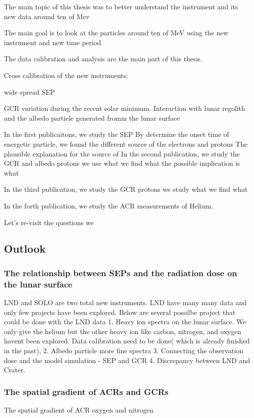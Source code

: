 


The main topic of this thesis was to better understand the instrument and its new data around ten of Mev

The main goal is to look at the particles around ten of MeV using the new instrument and new time period

The data calibration and analysis are the main part of this thesis. 

Cross calibration of the new instruments:


wide spread SEP

\ac{GCR} variation during the recent solar minimum. Interaction with lunar regolith and the albedo particle generated fromm the lunar surface\

In the first publicaitons, we study the SEP
   By determine the onset time of energetic particle, we found the different source of the electrons and protons
  The plausible explanation for the source of 
In the second publication, we study the GCR and albedo protons
  we use what 
  we find what 
   the possible implication is what

In the third publication, we study the GCR protons
   we study what 
   we find what 
   

In the forth publication, we study the ACR measurements of Helium.

Let's re-visit the questions we 
\subsection*{Outlook}

\subsubsection{The relationship between SEPs and the radiation dose on the lunar surface}

LND and SOLO are two total new instruments.
LND have many many data and only few projects have been explored.
Below are several possilbe project that could be done with the LND data
1. Heavy ion spectra on the lunar surface. We only give the helium but the other heavy ion like carbon, nitrogen, and oxygen havent been explored. Data calibration need to be done( which is already finished in the past), 
2. Albedo particle more fine spectra
3. Connecting the observation dose and the model simulation - SEP and GCR
4. Discrepancy between LND and Crater.



\subsubsection{The spatial gradient of ACRs and GCRs}
The spatial gradient of ACR oxygen and nitrogen


